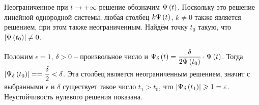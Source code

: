 \documentclass[a5paper,10pt]{article}
\begin{document}
Неограниченное при $t \to +\infty$ решение обозначим $\Psi\left(t\right)$. Поскольку это решение линейной однородной системы, любая столбец $k \Psi\left(t\right)$, $k \ne 0$ также является решением, при этом также неограниченным. Найдём точку $t_{0}$ такую, что $\left|\Psi\left(t_{0}\right)\right| \ne 0$.

Положим $\epsilon = 1$, $\delta > 0$ -- произвольное число и $\Psi_{\delta}\left(t\right) =  \dfrac {\delta} {2\Psi\left(t_{0}\right)} \cdot \Psi\left(t\right)$. Тогда $\vbr{\Psi_{\delta}\br{t_{0}}} = \linebreak = \dfrac {\delta}  {2} < \delta$. Эта столбец является неограниченным решением, значит с выбранными $\epsilon$ и $\delta$ существует такое число $t_{1} > t_{0}$, что $\left|\Psi_{\delta}\left(t_{1}\right)\right| \geqslant 1 = \varepsilon$. Неустойчивость нулевого решения показана.
\end{document}
